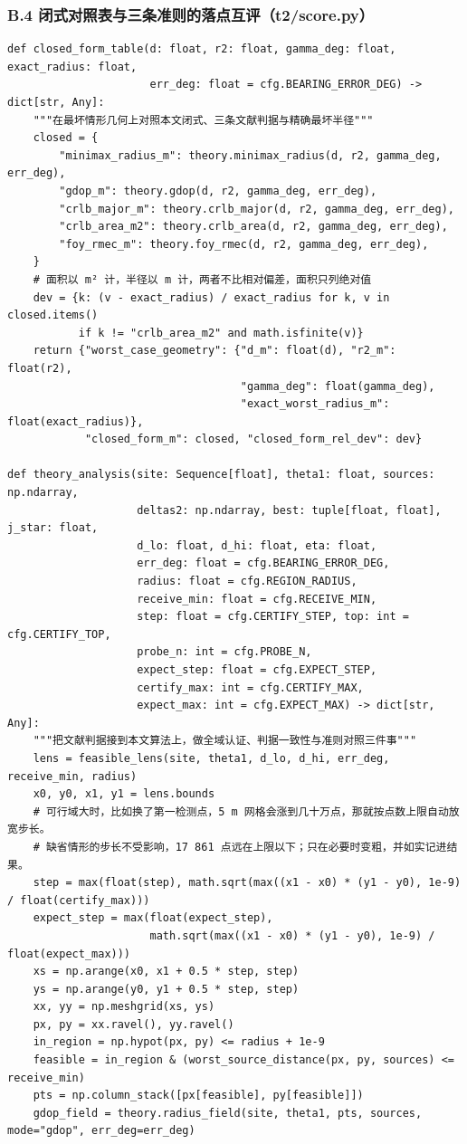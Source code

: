 \documentclass[UTF8, zihao=5,AutoFakeBold=2]{ctexart}
\begin{document}
	\subsubsection*{B.4 \quad 闭式对照表与三条准则的落点互评（t2/score.py）}
	\begin{lstlisting}
def closed_form_table(d: float, r2: float, gamma_deg: float, exact_radius: float,
                      err_deg: float = cfg.BEARING_ERROR_DEG) -> dict[str, Any]:
    """在最坏情形几何上对照本文闭式、三条文献判据与精确最坏半径"""
    closed = {
        "minimax_radius_m": theory.minimax_radius(d, r2, gamma_deg, err_deg),
        "gdop_m": theory.gdop(d, r2, gamma_deg, err_deg),
        "crlb_major_m": theory.crlb_major(d, r2, gamma_deg, err_deg),
        "crlb_area_m2": theory.crlb_area(d, r2, gamma_deg, err_deg),
        "foy_rmec_m": theory.foy_rmec(d, r2, gamma_deg, err_deg),
    }
    # 面积以 m² 计，半径以 m 计，两者不比相对偏差，面积只列绝对值
    dev = {k: (v - exact_radius) / exact_radius for k, v in closed.items()
           if k != "crlb_area_m2" and math.isfinite(v)}
    return {"worst_case_geometry": {"d_m": float(d), "r2_m": float(r2),
                                    "gamma_deg": float(gamma_deg),
                                    "exact_worst_radius_m": float(exact_radius)},
            "closed_form_m": closed, "closed_form_rel_dev": dev}

def theory_analysis(site: Sequence[float], theta1: float, sources: np.ndarray,
                    deltas2: np.ndarray, best: tuple[float, float], j_star: float,
                    d_lo: float, d_hi: float, eta: float,
                    err_deg: float = cfg.BEARING_ERROR_DEG,
                    radius: float = cfg.REGION_RADIUS,
                    receive_min: float = cfg.RECEIVE_MIN,
                    step: float = cfg.CERTIFY_STEP, top: int = cfg.CERTIFY_TOP,
                    probe_n: int = cfg.PROBE_N,
                    expect_step: float = cfg.EXPECT_STEP,
                    certify_max: int = cfg.CERTIFY_MAX,
                    expect_max: int = cfg.EXPECT_MAX) -> dict[str, Any]:
    """把文献判据接到本文算法上，做全域认证、判据一致性与准则对照三件事"""
    lens = feasible_lens(site, theta1, d_lo, d_hi, err_deg, receive_min, radius)
    x0, y0, x1, y1 = lens.bounds
    # 可行域大时，比如换了第一检测点，5 m 网格会涨到几十万点，那就按点数上限自动放宽步长。
    # 缺省情形的步长不受影响，17 861 点远在上限以下；只在必要时变粗，并如实记进结果。
    step = max(float(step), math.sqrt(max((x1 - x0) * (y1 - y0), 1e-9) / float(certify_max)))
    expect_step = max(float(expect_step),
                      math.sqrt(max((x1 - x0) * (y1 - y0), 1e-9) / float(expect_max)))
    xs = np.arange(x0, x1 + 0.5 * step, step)
    ys = np.arange(y0, y1 + 0.5 * step, step)
    xx, yy = np.meshgrid(xs, ys)
    px, py = xx.ravel(), yy.ravel()
    in_region = np.hypot(px, py) <= radius + 1e-9
    feasible = in_region & (worst_source_distance(px, py, sources) <= receive_min)
    pts = np.column_stack([px[feasible], py[feasible]])
    gdop_field = theory.radius_field(site, theta1, pts, sources, mode="gdop", err_deg=err_deg)


\end{lstlisting}
\end{document}
